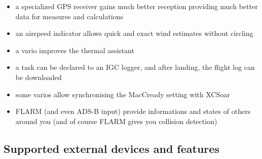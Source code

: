\begin{itemize}
\item a specialized GPS receiver gains much better reception providing much 
better data for measures and calculations
\item an airspeed indicator allows quick and exact wind estimates
  without circling
\item a vario improves the thermal assistant
\item a task can be declared to an IGC logger, and after landing, the
  flight log can be downloaded
\item some varios allow synchronising the MacCready setting with
  XCSoar
\item FLARM (and even ADS-B input) provide informations and states of others
around you (and of course FLARM gives you collision detection)
\end{itemize}

\subsection*{Supported external devices and features}
\label{sec:supported-varios}

\newcommand{\y}[0]{{ $\surd$ }}
\noindent{}


